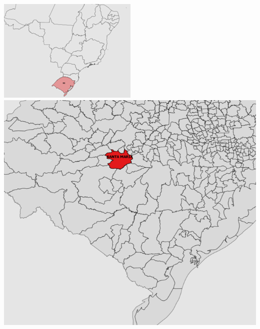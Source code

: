 \documentclass{article}
\begin{document}
\includegraphics[width=.3\textwidth]{img_altera_8.png}  %
\includegraphics[width=.6\textwidth]{img_altera_7.png}  %
\newpage
\end{document}
